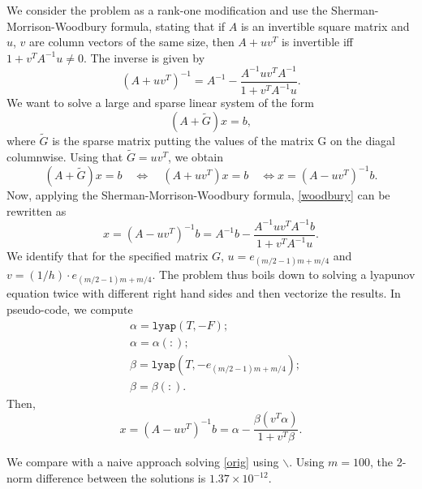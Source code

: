 We consider the problem as a rank-one modification and use the Sherman-Morrison-Woodbury formula, stating that if $A$ is an invertible square matrix and $u$, $v$ are column vectors of the same size, then $A+uv^T$ is invertible iff $1+v^TA^{-1}u\neq 0$. The inverse is given by
\begin{equation}
(A+uv^T)^{-1} = A^{-1}-\frac{A^{-1}uv^TA^{-1}}{1+v^TA^{-1}u}.
\end{equation}
We want to solve a large and sparse linear system of the form 
\begin{equation}\label{orig}
(A+\tilde{G})x = b,
\end{equation}
where $\tilde{G}$ is the sparse matrix putting the values of the matrix G on the diagal columnwise. 
Using that $\tilde{G} = uv^T$, we obtain
\begin{equation}\label{woodbury}
(A+\tilde{G})x = b\quad\Leftrightarrow\quad (A+uv^T)x = b
\quad\Leftrightarrow x=(A-uv^T)^{-1}b.
\end{equation}
Now, applying the Sherman-Morrison-Woodbury formula, \eqref{woodbury} can be rewritten as
\begin{equation}
x=(A-uv^T)^{-1}b = A^{-1}b-\frac{A^{-1}uv^TA^{-1}b}{1+v^TA^{-1}u}.
\end{equation}
We identify that for the specified matrix $G$, $u =e_{(m/2-1)m+m/4}$ and $v = (1/h)\cdot e_{(m/2-1)m+m/4}$. The problem thus boils down to solving a lyapunov equation twice with different right hand sides and then vectorize the results. In pseudo-code, we compute
\begin{equation}
\begin{aligned}
&\alpha = \texttt{lyap}(T,-F);\\
&\alpha = \alpha(:);\\
&\beta = \texttt{lyap}(T,-e_{(m/2-1)m+m/4});\\
&\beta = \beta(:).
\end{aligned}
\end{equation}
Then, 
\begin{equation}
x=(A-uv^T)^{-1}b  = \alpha -\frac{\beta(v^T\alpha)}{1+v^T\beta}.
\end{equation}

We compare with a naive approach solving \eqref{orig} using $\backslash$. Using $m=100$, the 2-norm difference between the solutions is $1.37\times 10^{-12}$. 





